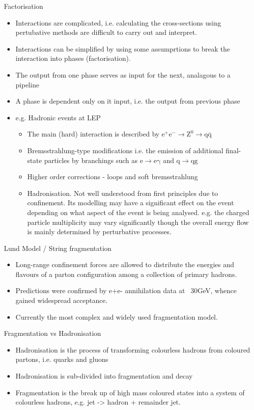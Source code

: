 Factorisation
\begin{itemize}
  \item Interactions are complicated, i.e. calculating the cross-sections using pertubative methods are difficult to carry out and interpret.
  \item Interactions can be simplified by using some assumprtions to break the interaction into phases (factorisation).
  \item The output from one phase serves as input for the next, analagous to a pipeline
  \item A phase is dependent only on it input, i.e. the output from previous phase
  \item e.g. Hadronic events at LEP 
  \begin{itemize}
    \item The main (hard) interaction is described by $\mathrm{e}^+\mathrm{e}^- \rightarrow \mathrm{Z}^0 \rightarrow \mathrm{q}\mathrm{\bar{q}}$
    \item Bremsstrahlung-type modifications i.e. the emission of additional final-state particles by branchings such as $\mathrm{e} \rightarrow \mathrm{e}\mathrm{\gamma}$ and $\mathrm{q} \rightarrow \mathrm{qg}$
    \item Higher order corrections - loops and soft bremsstrahlung
    \item Hadronisation. Not well understood from first principles due to confinement. Its modelling may have a significant effect on the event depending on what aspect of the event is being analysed. e.g. the charged particle multiplicity may vary significantly though the overall energy flow is mainly determined by perturbative processes.
  \end{itemize}
\end{itemize}

Lund Model / String fragmentation
\begin{itemize}
\item Long-range confinement forces are allowed to distribute the energies and flavours of a parton configuration among a collection of primary hadrons.
\item Predictions were confirmed by e+e- annihilation data at ~30GeV, whence gained widespread acceptance.
\item Currently the most complex and widely used fragmentation model.
\end{itemize}

Fragmentation vs Hadronisation
\begin{itemize}
  \item Hadronisation is the process of transforming colourless hadrons from coloured partons, i.e. quarks and gluons
  \item Hadronisation is sub-divided into fragmentation and decay
  \item Fragmentation is the break up of high mass coloured states into a system of colourless hadrons, e.g. jet -> hadron + remainder jet.
\end{itemize}

